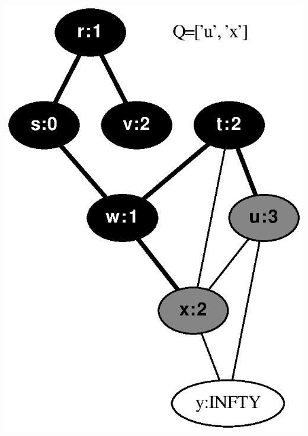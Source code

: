 \documentclass{article}
\begin{document}
\vspace{1em}
\includegraphics[height=.3\textheight]{clrs_example_bfs_05.eps}
\vspace{1em}
\end{document}
